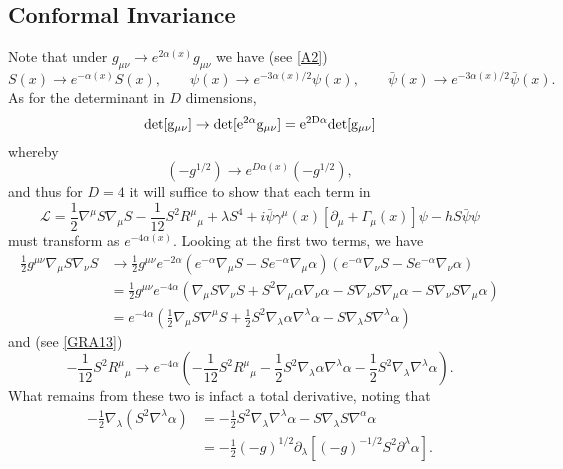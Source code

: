 \documentclass[10pt,letterpaper]{article}
\numberwithin{equation}{subsection}
\begin{document}
\subsection{Conformal Invariance}
Note that under $g_{\mu\nu}\to e^{2\alpha(x)}g_{\mu\nu}$ we have (see \ref{A2})
\begin{equation}
S(x) \to e^{-\alpha(x)}S(x),\qquad \psi(x)\to e^{-3\alpha(x)/2}\psi(x),\qquad \bar \psi(x)\to e^{-3\alpha(x)/2}\bar\psi(x).
\end{equation}
As for the determinant in $D$ dimensions,
\begin{equation}
	\rm{det}[g_{\mu\nu}]\to \rm{det}[e^{2\alpha}g_{\mu\nu}] = e^{2D\alpha}det[g_{\mu\nu}]
\end{equation}
whereby
\begin{equation}
	(-g^{1/2}) \to e^{D\alpha(x)}(-g^{1/2}),
\end{equation}
and thus for $D=4$ it will suffice to show that each term in 
\begin{equation}
\mathcal L =  \frac12 \nabla^\mu S \nabla_\mu S - \frac{1}{12} S^2 R^{\mu}{}_{\mu} + \lambda S^4 
+ i\bar\psi\gamma^\mu(x)[\partial_\mu + \Gamma_\mu(x)]\psi -hS\bar\psi\psi
\end{equation}
must transform as $e^{-4\alpha(x)}$. Looking at the first two terms, we have
\begin{align}
\frac12 g^{\mu\nu}\nabla_\mu S\nabla_\nu S &\to   \frac12 g^{\mu\nu}e^{-2\alpha} \left( e^{-\alpha} \nabla_\mu S - S e^{-\alpha}\nabla_\mu \alpha \right)\left( e^{-\alpha} \nabla_\nu S - S e^{-\alpha}\nabla_\nu \alpha \right)\\
&=  \frac12 g^{\mu\nu}e^{-4\alpha} \left( \nabla_\mu S\nabla_\nu S + S^2 \nabla_\mu\alpha\nabla_\nu\alpha -S \nabla_\nu S \nabla_\mu \alpha - S\nabla_\nu S\nabla_\mu \alpha \right)
\nonumber\\
&= e^{-4\alpha}\left( \frac{1}{2} \nabla_\mu S\nabla^\mu S + \frac{1}{2} S^2 \nabla_\lambda \alpha \nabla^\lambda\alpha - S \nabla_\lambda S\nabla^\lambda \alpha \right) 
\end{align}
and (see \ref{GRA13})
\begin{equation}
-\frac{1}{12} S^2 R^\mu{}_\mu \to e^{-4\alpha}\left(-\frac{1}{12} S^2 R^\mu{}_\mu -\frac12 S^2 \nabla_\lambda\alpha \nabla^\lambda \alpha -\frac12 S^2 \nabla_\lambda
\nabla^\lambda \alpha \right).
\end{equation}
What remains from these two is infact a total derivative, noting that
\begin{align}
-\frac12 \nabla_\lambda ( S^2 \nabla^\lambda \alpha ) &= -\frac12 S^2 \nabla_\lambda \nabla^\lambda \alpha - S\nabla_\lambda S\nabla^\alpha \alpha
\nonumber\\
&= -\frac{1}{2}(-g)^{1/2} \partial_\lambda \left[ (-g)^{-1/2}S^2\partial^\lambda \alpha \right].
\end{align}
\end{document}
